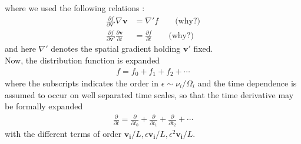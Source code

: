 where we used the following relations : 
\begin{align}
    \frac{\partial f}{\partial \bm{v}'} \nabla \bm{v} &= \nabla 'f \qquad \text{(why?)} \\
    \frac{\partial f}{\partial \bm{v}'} \frac{\partial \bm{v}}{\partial t} &= \frac{\partial f}{\partial t} \qquad \text{(why?)}
\end{align}
and here $\nabla '$ denotes the spatial gradient holding $\bm{v}'$ fixed. \\
Now, the distribution function is expanded
\begin{align}
    f = f_0 + f_1 + f_2 + \cdots
\end{align}
where the subscripts indicates the order in $\epsilon \sim \nu_i / \Omega_i$ and the time dependence is assumed to occur on well separated time scales, so that the time derivative may be formally expanded
\begin{align}
    \frac{\partial}{\partial t} = \frac{\partial}{\partial t_0} + \frac{\partial}{\partial t_1} + \frac{\partial}{\partial t_2} + \cdots
\end{align}
with the different terms of order $\bm{v_i}/L, \epsilon \bm{v_i}/L , \epsilon^2 \bm{v_i}/L$.